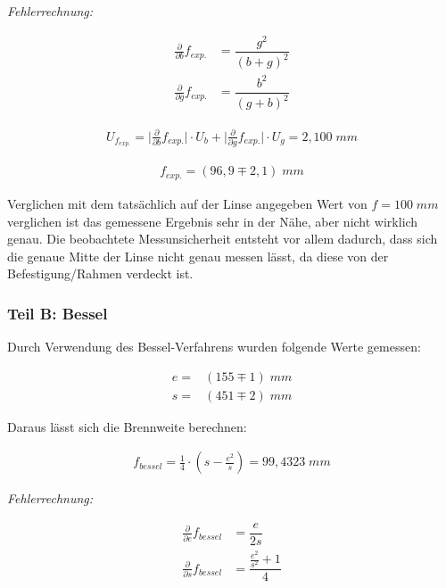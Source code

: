 \documentclass[a4paper]{scrartcl}
\numberwithin{equation}{subsection}
\begin{document}
\textit{Fehlerrechnung:}

\begin{align*}
\frac{\partial}{\partial b} f_{\textit{exp.}} &= 	\dfrac{g^2}{\left(b+g\right)^2}	 \\
\frac{\partial}{\partial g} f_{\textit{exp.}} &= \dfrac{b^2}{\left(g+b\right)^2}
\end{align*}

\begin{align*}
U_{f_{\textit{exp.}}} = \bigg | \frac{\partial}{\partial b} f_{\textit{exp.}} \bigg | \cdot U_{b} + 
					    \bigg | \frac{\partial}{\partial g} f_{\textit{exp.}} \bigg | \cdot U_{g} = 2,100 \;mm
\end{align*}

\begin{align*}
f_{\textit{exp.}} = (96,9 \mp 2,1) \;mm
\end{align*}

Verglichen mit dem tatsächlich auf der Linse angegeben Wert von $f = 100 \;mm$ verglichen ist das gemessene Ergebnis sehr in der Nähe, aber nicht wirklich genau.
Die beobachtete Messunsicherheit entsteht vor allem dadurch, dass sich die genaue Mitte der Linse nicht genau messen lässt, da diese von der Befestigung/Rahmen verdeckt ist.


\subsubsection{Teil B: Bessel}

Durch Verwendung des Bessel-Verfahrens wurden folgende Werte gemessen:

\begin{align*}
e =& (155 \mp 1) \;mm \\
s =& (451 \mp 2) \;mm
\end{align*}

Daraus lässt sich die Brennweite berechnen:

\begin{align}
f_{\textit{bessel}} = \frac{1}{4} \cdot \left( s - \frac{e^2}{s} \right) = 99,4323 \;mm
\end{align}

\textit{Fehlerrechnung:}

\begin{align*}
\frac{\partial}{\partial e} f_{\textit{bessel}} &= \dfrac{e}{2s}		 \\
\frac{\partial}{\partial s} f_{\textit{bessel}} &= \dfrac{\frac{e^2}{s^2}+1}{4}
\end{align*}
\end{document}
